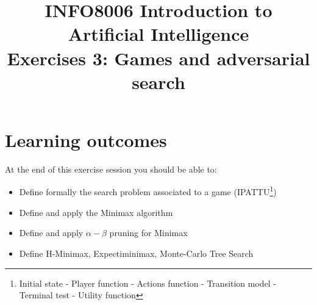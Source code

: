 \documentclass[9pt,a4paper]{extarticle}
\title{{\bf INFO8006 Introduction to Artificial Intelligence}\\[1em]
Exercises 3: Games and adversarial search}
\date{}
\begin{document}
\maketitle
\vspace{-4em}

  \section*{Learning outcomes}
    At the end of this exercise session you should be able to:
   \begin{itemize}
       \item Define formally the search problem associated to a game (IPATTU\footnote{Initial state - Player function - Actions function - Transition model - Terminal test - Utility function})
       \item Define and apply the Minimax algorithm
       \item Define and apply $\alpha-\beta$ pruning for Minimax
       \item Define H-Minimax, Expectiminimax, Monte-Carlo Tree Search
   \end{itemize}
\end{document}
